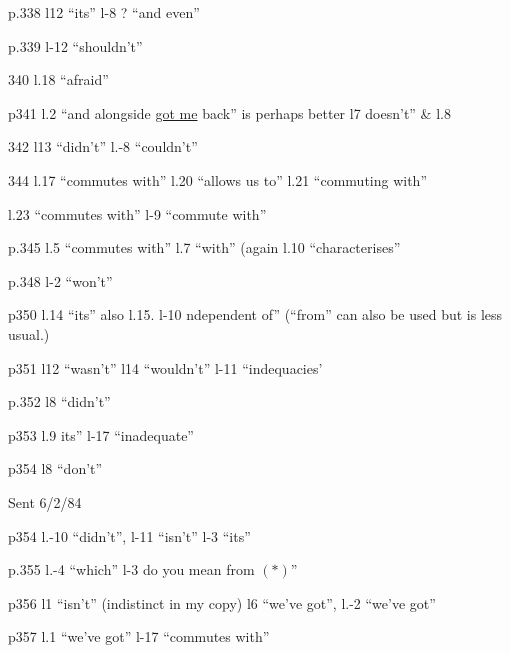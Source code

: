 p.338 l12 ``its'' l-8 ? ``and even'' 

p.339 l-12 ``shouldn't'' 

340 l.18 ``afraid''

p341 l.2 ``and alongside \uline{got me} back'' is perhaps better l7 doesn't'' \& l.8

342 l13 ``didn't'' l.-8 ``couldn't''

344 l.17 ``commutes with'' l.20 ``allows us to'' l.21 ``commuting with''

l.23 ``commutes with'' l-9 ``commute with''

p.345 l.5 ``commutes with'' l.7 ``with'' (again l.10 ``characterises''

p.348 l-2 ``won't''

p350 l.14 ``its'' also  l.15. l-10 ndependent of'' (``from'' can also be used but is less usual.)

p351 l12 ``wasn't'' l14 ``wouldn't'' l-11 ``indequacies'

p.352 l8 ``didn't''

p353 l.9 its'' l-17 ``inadequate''

p354 l8 ``don't''

Sent 6/2/84


p354 l.-10 ``didn't'', l-11 ``isn't'' l-3 ``its''

p.355 l.-4 ``which'' l-3 do you mean from $(*)$''

p356 l1 ``isn't'' (indistinct in my copy) l6 ``we've got'',  l.-2 ``we've got''

p357 l.1 ``we've got''  l-17 ``commutes with''

